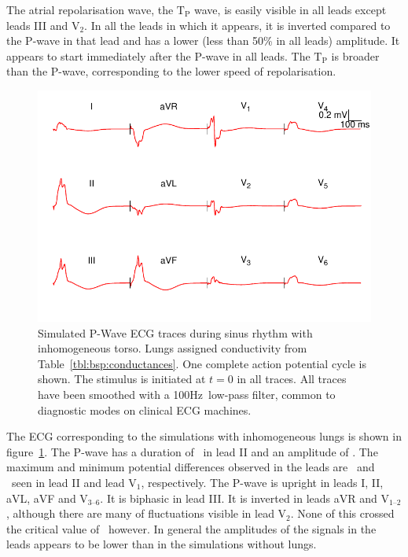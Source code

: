 The atrial repolarisation wave, the $\text{T}_{\text{P}}$ wave, is easily
visible in all leads except leads III and $\text{V}_{\text{2}}$.
In all the leads in which it appears, it is inverted compared to the P-wave in
that lead and has a lower (less than 50\% in all leads) amplitude.
It appears to start immediately after the P-wave in all leads.
The $\text{T}_{\text{P}}$ is broader than the P-wave, corresponding to the lower
speed of repolarisation.

\begin{figure}
\includegraphics{figures/bsp/ecg_lungs}
\caption[12 lead ECG during sinus rhythm, lungs present.]{
\label{bsp:fig:ecg_lungs}
Simulated P-Wave ECG traces during sinus rhythm with inhomogeneous torso.
Lungs assigned conductivity from Table~\ref{tbl:bsp:conductances}.
One complete action potential cycle is shown.
The stimulus is initiated at $t = 0$ in all traces.
All traces have been smoothed with a \unit{100}{Hz}\ low-pass filter, common to
diagnostic modes on clinical ECG machines.
}
\end{figure}

The ECG corresponding to the simulations with inhomogeneous lungs is shown in
figure~\ref{bsp:fig:ecg_lungs}.
The P-wave has a duration of \ in lead II and an amplitude of .
The maximum and minimum potential differences observed in the leads are
\ and \ seen in lead II and lead $\text{V}_{\text{1}}$, respectively.
The P-wave is upright in leads I, II, aVL, aVF and $\text{V}_{\text{3--6}}$.
It is biphasic in lead III.
It is inverted in leads aVR and $\text{V}_{\text{1--2}}$, although there are
many of fluctuations visible in lead $\text{V}_{\text{2}}$.
None of this crossed the critical value of \ however.
In general the amplitudes of the signals in the leads appears to be lower than
in the simulations without lungs.

